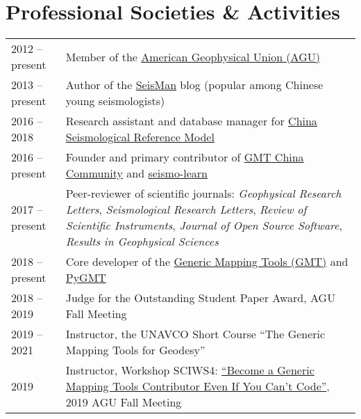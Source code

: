 \section*{Professional Societies \& Activities}

\newcommand{\tabitem}{~~\llap{\textbullet}~~}

\begin{tabular}{p{} p{}}
2012 -- present & Member of the \href{https://sites.agu.org/}{American Geophysical Union (AGU)} \\
2013 -- present & Author of the \href{https://blog.seisman.info}{SeisMan} blog (popular among Chinese young seismologists) \\
2016 -- 2018    & Research assistant and database manager for \href{http://chinageorefmodel.org/}{China Seismological Reference Model} \\
2016 -- present & Founder and primary contributor of \href{http://gmt-china.org/}{GMT China Community} and \href{https://seismo-learn.org/}{seismo-learn} \\
2017 -- present & Peer-reviewer of scientific journals:
                  \textit{Geophysical Research Letters},
                  \textit{Seismological Research Letters},
                  \textit{Review of Scientific Instruments},
                  \textit{Journal of Open Source Software},
                  \textit{Results in Geophysical Sciences} \\
2018 -- present & Core developer of the \href{https://github.com/GenericMappingTools/gmt}{Generic Mapping Tools (GMT)} and \href{https://github.com/GenericMappingTools/pygmt}{PyGMT} \\
2018 -- 2019 & Judge for the Outstanding Student Paper Award, AGU Fall Meeting \\
2019 -- 2021 & Instructor, the UNAVCO Short Course ``The Generic Mapping Tools for Geodesy'' \\
2019 & Instructor, Workshop SCIWS4: \href{https://www.agu.org/Events/SCIWS4-Generic-Mapping-Tools}{``Become a Generic Mapping Tools Contributor Even If You Can't Code''}, 2019 AGU Fall Meeting \\
\end{tabular}
